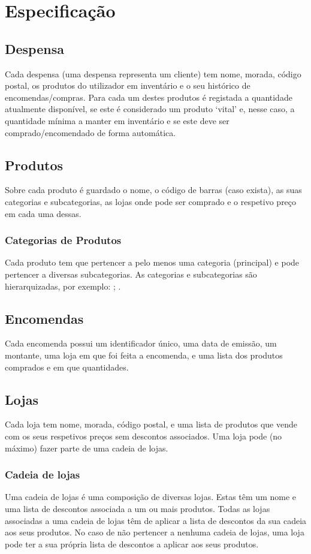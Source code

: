 \documentclass{report}
\begin{document}
\chapter{Especificação}
\section{Despensa}
Cada despensa (uma despensa representa um cliente) tem nome, morada,
código postal, os produtos do utilizador em inventário e o seu histórico
de encomendas/compras. Para cada um destes produtos é registada a quantidade
atualmente disponível, se este é considerado um produto `vital' e, nesse caso,
a quantidade mínima a manter em inventário e se este deve ser
comprado/encomendado de forma automática.

\section{Produtos}
Sobre cada produto é guardado o nome, o código de barras (caso exista), as suas
categorias e subcategorias, as lojas onde pode ser comprado e o respetivo preço
em cada uma dessas.
\subsection{Categorias de Produtos}
Cada produto tem que pertencer a pelo menos uma categoria (principal) e pode
pertencer a diversas subcategorias. As categorias e subcategorias são
hierarquizadas, por exemplo: ;
.

\section{Encomendas}
Cada encomenda possui um identificador único, uma data de emissão, um montante,
uma loja em que foi feita a encomenda, e uma lista dos produtos comprados e em
que quantidades.

\section{Lojas}
Cada loja tem nome, morada, código postal, e uma lista de produtos que vende
com os seus respetivos preços sem descontos associados.
\newline
Uma loja pode (no máximo) fazer parte de uma cadeia de lojas.
\subsection{Cadeia de lojas}
Uma cadeia de lojas é uma composição de diversas lojas. Estas têm um nome
e uma lista de descontos associada a um ou mais produtos. Todas as lojas
associadas a uma cadeia de lojas têm de aplicar a lista de descontos da sua
cadeia aos seus produtos.
\newline
No caso de não pertencer a nenhuma cadeia de lojas, uma loja pode ter a sua
própria lista de descontos a aplicar aos seus produtos.
\end{document}

